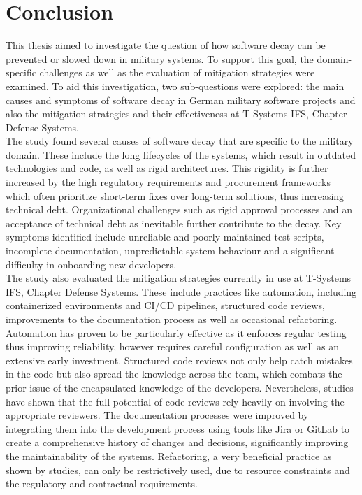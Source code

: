 \section{Conclusion}
This thesis aimed to investigate the question of how software decay can be prevented or slowed down in military systems. To support this goal, the domain-specific challenges as well as the evaluation of mitigation strategies were examined.
To aid this investigation, two sub-questions were explored: the main causes and symptoms of software decay in German military software projects and also the mitigation strategies and their effectiveness at T-Systems IFS, Chapter Defense Systems.\\

The study found several causes of software decay that are specific to the military domain. These include the long lifecycles of the systems, which result in outdated technologies and code, as well as rigid architectures. This rigidity is further
increased by the high regulatory requirements and procurement frameworks which often prioritize short-term fixes over long-term solutions, thus increasing technical debt. Organizational challenges such as rigid approval processes
and an acceptance of technical debt as inevitable further contribute to the decay. Key symptoms identified include unreliable and poorly maintained test scripts, incomplete documentation, unpredictable system behaviour and a significant difficulty in onboarding new developers.\\

The study also evaluated the mitigation strategies currently in use at T-Systems IFS, Chapter Defense Systems. These include practices like automation, including containerized environments and CI/CD pipelines,
structured code reviews, improvements to the documentation process as well as occasional refactoring. Automation has proven to be particularly effective as it enforces regular testing thus improving reliability, however requires careful configuration as well as an extensive early investment.
Structured code reviews not only help catch mistakes in the code but also spread the knowledge across the team, which combats the prior issue of the encapsulated knowledge of the developers. Nevertheless, studies have shown that the full potential of code reviews rely heavily on involving the appropriate reviewers.
The documentation processes were improved by integrating them into the development process using tools like Jira or GitLab to create a comprehensive history of changes and decisions, significantly improving the maintainability of the systems.
Refactoring, a very beneficial practice as shown by studies, can only be restrictively used, due to resource constraints and the regulatory and contractual requirements.\\

